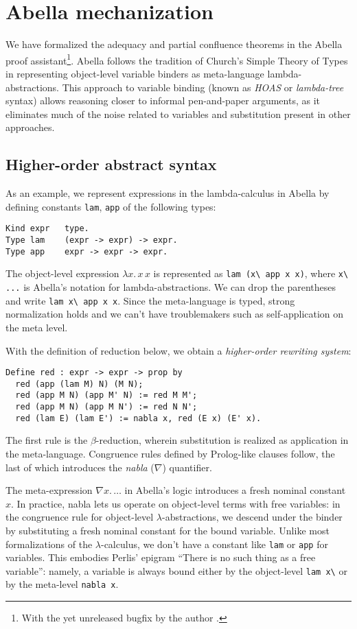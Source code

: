 \documentclass[a4paper, 11pt,titlepage, openright, twoside]{report}
\newcommand{\+}{\enspace}
\begin{document}
\chapter{Abella mechanization}

We have formalized the adequacy and partial confluence theorems in the Abella proof assistant\footnote{
	With the yet unreleased bugfix by the author \cite{abellafix}.
}.
Abella follows the tradition of Church's Simple Theory of Types
in representing object-level variable binders as meta-language lambda-abstractions.
This approach to variable binding (known as \textit{HOAS} or \textit{lambda-tree} syntax)
allows reasoning closer to informal pen-and-paper arguments, as it eliminates
much of the noise related to variables and substitution present in other approaches.

\section{Higher-order abstract syntax}

As an example, we represent expressions in the lambda-calculus in Abella by defining constants \lstinline{lam}, \lstinline{app} of the following types:
\begin{lstlisting}
Kind expr   type.
Type lam    (expr -> expr) -> expr.
Type app    expr -> expr -> expr.
\end{lstlisting}
The object-level expression $λx.\,x\,x$ is represented as \lstinline{lam (x\ app x x)},
where \lstinline{x\ ...} is Abella's notation for lambda-abstractions.
We can drop the parentheses and write \lstinline{lam x\ app x x}.
Since the meta-language is typed, strong normalization holds and we can't have troublemakers such
as self-application on the meta level.

With the definition of reduction below, we obtain a \textit{higher-order rewriting system}:
\begin{lstlisting}
Define red : expr -> expr -> prop by
  red (app (lam M) N) (M N);
  red (app M N) (app M' N) := red M M';
  red (app M N) (app M N') := red N N';
  red (lam E) (lam E') := nabla x, red (E x) (E' x).
\end{lstlisting}
The first rule is the $β$-reduction, wherein substitution is realized as application in the meta-language.
Congruence rules defined by Prolog-like clauses follow,
the last of which introduces the \textit{nabla} ($\nabla$) quantifier.

The meta-expression $\nabla x.\,…$ in Abella's logic introduces a fresh nominal constant $x$.
In practice, nabla lets us operate on object-level terms with free variables:
in the congruence rule for object-level $λ$-abstractions,
we descend under the binder by substituting a fresh nominal constant for the bound variable.
Unlike most formalizations of the $λ$-calculus, we don't have a constant like \lstinline{lam} or \lstinline{app} for variables.
This embodies Perlis' epigram ``There is no such thing as a free variable'':
namely, a variable is always bound
either by the object-level \lstinline{lam x\}
or by the meta-level \lstinline{nabla x}.
\end{document}
